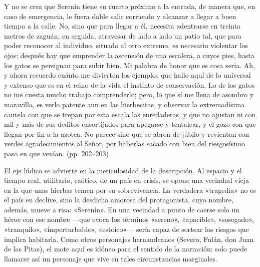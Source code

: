 \documentclass[14pt,twoside,final]{extbook} %
\begin{document}
\begin{quoting}
Y no se crea que Serenín tiene su cuarto próximo a la entrada, de manera que, en caso de emergencia, le fuera dable salir corriendo y alcanzar a llegar a buen tiempo a la calle. No, sino que para llegar a él, necesita adentrarse en treinta metros de zaguán, en seguida, atravesar de lado a lado un patio tal, que para poder reconocer al individuo, situado al otro extremo, es necesario violentar los ojos; después hay que emprender la ascensión de una escalera, a cuyos pies, hasta los gatos se persignan para subir bien. Mi palabra de honor que es cosa seria. Ah, y ahora recuerdo cuánto me divierten los ejemplos que hallo aquí de lo universal y extenso que es en el reino de la vida el instinto de conservación. Lo de los gatos no me cuesta mucho trabajo comprenderlo; pero, lo que sí me llena de asombro y maravilla, es verlo patente aun en las hierbecitas, y observar la extremadísima cautela con que se trepan por esta escala las enredaderas, y que no ajustan ni con mil y más de sus deditos ensortijados para apegarse y tentalear, y el gozo con que llegan por fin a la azotea. No parece sino que se abren de júbilo y revientan con verdes agradecimientos al Señor, por haberlas sacado con bien del riesgosísimo paso en que venían. (pp. 202--203)
\end{quoting}
El eje lúdico se advierte en la meticulosidad de la descripción. Al espacio y el tiempo real, utilitario, caótico, de un país en crisis, se opone una vecindad vieja en la que unas hierbas temen por su sobrevivencia. La verdadera «tragedia» no es el país en declive, sino la desdicha amorosa del protagonista, cuyo nombre, además, mueve a risa: «Serenín». En una vecindad a punto de caerse solo un héroe con ese nombre ---que evoca los términos «sereno», «apacible», «sosegado», «tranquilo», «imperturbable», «estoico»--- sería capaz de sortear los riesgos que implica habitarla. Como otros personajes hernandeanos (Severo, Fulán, don Juan de las Pitas), el mote aquí es idóneo para el sentido de la narración: solo puede llamarse así un personaje que vive en tales circunstancias marginales.
\end{document}
